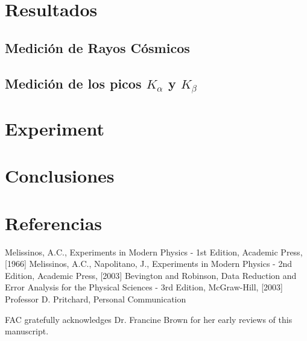     \section{Resultados}
    
    \subsection{Medición de Rayos Cósmicos}

    \subsection{Medición de los picos $K_{\alpha}$ y $K_{\beta}$}
    
    \section{Experiment}
    
    \section{Conclusiones}
    

    \section{Referencias}
    
    
    
    
    \begin{thebibliography}{99}
    Melissinos, A.C., Experiments in Modern
      Physics - 1st Edition, Academic Press,  [1966]
    Melissinos, A.C., Napolitano, J.,  Experiments in Modern
      Physics - 2nd Edition, Academic Press,  [2003]
    Bevington and Robinson, Data Reduction and
      Error Analysis for the Physical Sciences - 3rd Edition, McGraw-Hill,
      [2003]
    Professor D. Pritchard, Personal Communication
    \end{thebibliography}
    
    
    \begin{acknowledgments} FAC gratefully acknowledges Dr. Francine Brown for
    her early reviews of this manuscript.
    \end{acknowledgments}
    
